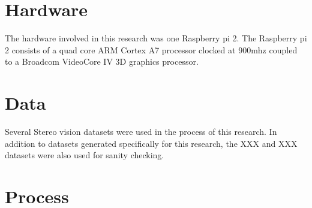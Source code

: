 \thispagestyle{plain}
\section{Hardware}
The hardware involved in this research was one Raspberry pi 2.  The Raspberry pi 2 consists of a quad core ARM Cortex A7 processor clocked at 900mhz coupled to a Broadcom VideoCore IV 3D graphics processor.
\section{Data}
Several Stereo vision datasets were used in the process of this research.  In addition to datasets generated specifically for this research, the XXX and XXX datasets were also used for sanity checking.
\section{Process}

